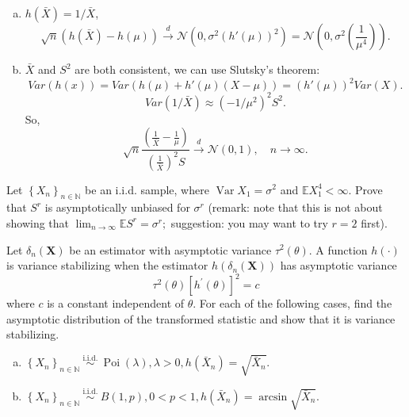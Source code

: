 \begin{solution}
    \begin{enumerate}[(a)]
        \item $h(\bar{X})=1/\bar{X}$, \[
            \sqrt{n}(h(\bar{X}) - h(\mu)) \stackrel{d}{\rightarrow} \mathcal{N}(0,\sigma^2(h'(\mu))^2)=\mathcal{N}\left(0,\sigma^2\left(\frac{1}{\mu^4}\right)\right).
        \]
        \item $\bar{X}$ and $S^2$ are both consistent, we can use Slutsky's theorem: 
        \[
            Var(h(x))=Var(h(\mu)+h'(\mu)(X-\mu))=(h'(\mu))^2Var(X). 
        \]
        \[
            Var(1/\bar{X})\approx (-1/\mu^2)^2S^2. 
        \]
        So, \[
            \sqrt{n} \frac{\left(\frac{1}{\bar{X}}-\frac{1}{\mu}\right)}{\left(\frac{1}{\bar{X}}\right)^{2} S} \stackrel{d}{\rightarrow} \mathcal{N}(0,1), \quad n \rightarrow \infty. 
        \]
    \end{enumerate}
\end{solution}

\begin{ex}
    Let \(\left\{X_{n}\right\}_{n \in \mathbb{N}}\) be an i.i.d. sample, where \(\operatorname{Var} X_{1}=\sigma^{2}\) and \(\mathbb{E} X_{1}^{4}<\infty\). Prove that \(S^{r}\) is asymptotically unbiased for \(\sigma^{r}\) (remark: note that this is not about showing that \(\lim _{n \rightarrow \infty} \mathbb{E} S^{r}=\sigma^{r} ;\) suggestion: you may want to try \(r=2\) first). 
\end{ex}


\begin{ex}
    Let \(\delta_{n}(\mathbf{X})\) be an estimator with asymptotic variance \(\tau^{2}(\theta)\). A function \(h(\cdot)\) is variance stabilizing when the estimator \(h\left(\delta_{n}(\mathbf{X})\right)\) has asymptotic variance
    \begin{equation}
        \label{eq:6.12}
        \tau^{2}(\theta)\left[h^{\prime}(\theta)\right]^{2}=c
    \end{equation}
    where \(c\) is a constant independent of \(\theta\). For each of the following cases, find the asymptotic distribution of the transformed statistic and show that it is variance stabilizing. 
    \begin{enumerate}[(a)]
        \item \(\left\{X_{n}\right\}_{n \in \mathbb{N}} \stackrel{\text { i.i.d. }}{\sim} \operatorname{Poi}(\lambda), \lambda>0, h\left(\bar{X}_{n}\right)=\sqrt{\bar{X}_{n}}\). 
        \item \(\left\{X_{n}\right\}_{n \in \mathbb{N}} \stackrel{\text { i.i.d. }}{\sim} B(1, p), 0<p<1, h\left(\bar{X}_{n}\right)=\arcsin \sqrt{\bar{X}_{n}}\). 
    \end{enumerate}
\end{ex}

